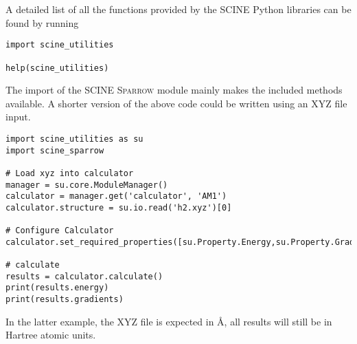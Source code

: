 \documentclass[]{tufte-book}
\begin{document}
A detailed list of all the functions provided by the \textsc{SCINE} Python libraries can be found by running
\begin{verbatim}
import scine_utilities

help(scine_utilities)
\end{verbatim}
The import of the SCINE \textsc{Sparrow} module mainly makes the included methods available.
A shorter version of the above code could be written using an XYZ file input.
\begin{verbatim}
import scine_utilities as su
import scine_sparrow

# Load xyz into calculator
manager = su.core.ModuleManager()
calculator = manager.get('calculator', 'AM1')
calculator.structure = su.io.read('h2.xyz')[0]

# Configure Calculator
calculator.set_required_properties([su.Property.Energy,su.Property.Gradients])

# calculate
results = calculator.calculate()
print(results.energy)
print(results.gradients)
\end{verbatim}
In the latter example, the XYZ file is expected in \AA{}, all results will still be in Hartree atomic units.
\end{document}
